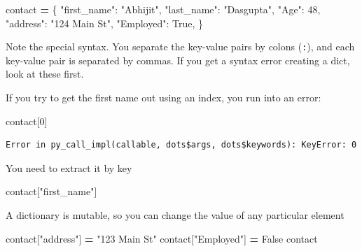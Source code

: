 \documentclass[
  letterpaper,
]{scrbook}
\newenvironment{Shaded}{\begin{snugshade}}{\end{snugshade}}
\newcommand{\DecValTok}[1]{\textcolor[rgb]{0.00,0.00,0.81}{#1}}
\newcommand{\NormalTok}[1]{#1}
\newcommand{\OperatorTok}[1]{\textcolor[rgb]{0.81,0.36,0.00}{\textbf{#1}}}
\newcommand{\StringTok}[1]{\textcolor[rgb]{0.31,0.60,0.02}{#1}}
\newcommand{\VariableTok}[1]{\textcolor[rgb]{0.00,0.00,0.00}{#1}}
\begin{document}
\begin{Shaded}
\begin{Highlighting}[]
\NormalTok{contact }\OperatorTok{=}\NormalTok{ \{}
    \StringTok{"first\_name"}\NormalTok{: }\StringTok{"Abhijit"}\NormalTok{,}
    \StringTok{"last\_name"}\NormalTok{: }\StringTok{"Dasgupta"}\NormalTok{,}
    \StringTok{"Age"}\NormalTok{: }\DecValTok{48}\NormalTok{,}
    \StringTok{"address"}\NormalTok{: }\StringTok{"124 Main St"}\NormalTok{,}
    \StringTok{"Employed"}\NormalTok{: }\VariableTok{True}\NormalTok{,}
\NormalTok{\}}
\end{Highlighting}
\end{Shaded}

Note the special syntax. You separate the key-value pairs by colons (\texttt{:}), and each key-value pair is separated by commas. If you get a syntax error creating a dict, look at these first.

If you try to get the first name out using an index, you run into an error:

\begin{Shaded}
\begin{Highlighting}[]
\NormalTok{contact[}\DecValTok{0}\NormalTok{]}
\end{Highlighting}
\end{Shaded}

\begin{verbatim}
Error in py_call_impl(callable, dots$args, dots$keywords): KeyError: 0
\end{verbatim}

You need to extract it by key

\begin{Shaded}
\begin{Highlighting}[]
\NormalTok{contact[}\StringTok{"first\_name"}\NormalTok{]}
\end{Highlighting}
\end{Shaded}

A dictionary is mutable, so you can change the value of any particular element

\begin{Shaded}
\begin{Highlighting}[]
\NormalTok{contact[}\StringTok{"address"}\NormalTok{] }\OperatorTok{=} \StringTok{"123 Main St"}
\NormalTok{contact[}\StringTok{"Employed"}\NormalTok{] }\OperatorTok{=} \VariableTok{False}
\NormalTok{contact}
\end{Highlighting}
\end{Shaded}
\end{document}
